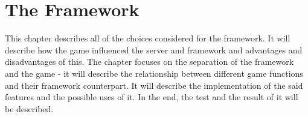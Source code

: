 \chapter{The Framework}

This chapter describes all of the choices considered for the framework. It will describe how the game influenced the server and framework and advantages and disadvantages of this. The chapter focuses on the separation of the framework and the game - it will describe the relationship between different game functions and their framework counterpart. It will describe the implementation of the said features and the possible uses of it. In the end, the test and the result of it will be described.



